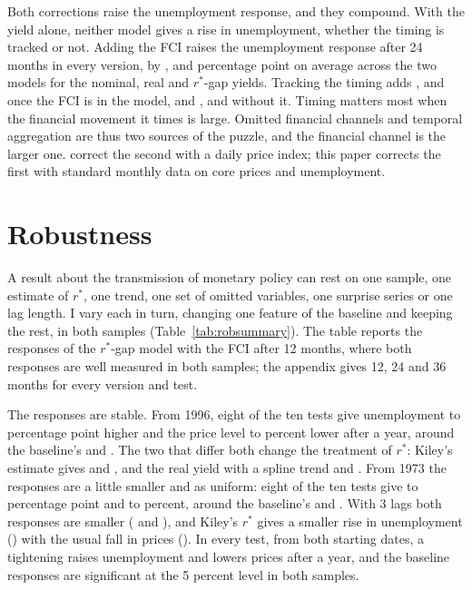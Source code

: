 \documentclass[11pt]{article}
\newcommand{\rs}{r^{*}}
\begin{document}


Both corrections raise the unemployment response, and they compound. With the yield alone, neither model gives a rise in unemployment, whether the timing is tracked or not. Adding the FCI raises the unemployment response after 24 months in every version, by ,  and  percentage point on average across the two models for the nominal, real and $\rs$-gap yields. Tracking the timing adds ,  and  once the FCI is in the model, and ,  and  without it. Timing matters most when the financial movement it times is large. Omitted financial channels and temporal aggregation are thus two sources of the puzzle, and the financial channel is the larger one. \citet{jacobson2026} correct the second with a daily price index; this paper corrects the first with standard monthly data on core prices and unemployment.

\FloatBarrier
\section{Robustness}\label{sec:rob}
A result about the transmission of monetary policy can rest on one sample, one estimate of $\rs$, one trend, one set of omitted variables, one surprise series or one lag length. I vary each in turn, changing one feature of the baseline and keeping the rest, in both samples (Table~\ref{tab:robsummary}). The table reports the responses of the $\rs$-gap model with the FCI after 12 months, where both responses are well measured in both samples; the appendix gives 12, 24 and 36 months for every version and test.



The responses are stable. From 1996, eight of the ten tests give unemployment  to  percentage point higher and the price level  to  percent lower after a year, around the baseline's  and . The two that differ both change the treatment of $\rs$: Kiley's estimate gives  and , and the real yield with a spline trend  and . From 1973 the responses are a little smaller and as uniform: eight of the ten tests give  to  percentage point and  to  percent, around the baseline's  and . With 3 lags both responses are smaller ( and ), and Kiley's $\rs$ gives a smaller rise in unemployment () with the usual fall in prices (). In every test, from both starting dates, a tightening raises unemployment and lowers prices after a year, and the baseline responses are significant at the 5 percent level in both samples.
\end{document}
